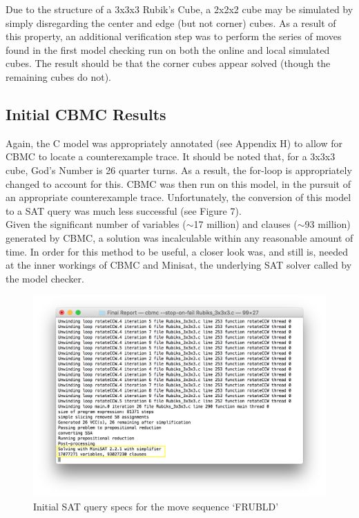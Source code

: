 \documentclass{article}
\begin{document}
\noindent Due to the structure of a 3x3x3 Rubik's Cube, a 2x2x2 cube may be simulated by simply disregarding the center and edge (but not corner) cubes. As a result of this property, an additional verification step was to perform the series of moves found in the first model checking run on both the online and local simulated cubes. The result should be that the corner cubes appear solved (though the remaining cubes do not).

\subsection {Initial CBMC Results}

Again, the C model was appropriately annotated (see Appendix H) to allow for CBMC to locate a counterexample trace. It should be noted that, for a 3x3x3 cube, God's Number is 26 quarter turns. As a result, the for-loop is appropriately changed to account for this. CBMC was then run on this model, in the pursuit of an appropriate counterexample trace. Unfortunately, the conversion of this model to a SAT query was much less successful (see Figure 7).\\

\noindent Given the significant number of variables ($\sim$17 million) and clauses ($\sim$93 million) generated by CBMC, a solution was incalculable within any reasonable amount of time. In order for this method to be useful, a closer look was, and still is, needed at the inner workings of CBMC and Minisat, the underlying SAT solver called by the model checker.\\

\begin{figure}[h]
\includegraphics[width=\textwidth]{pics/3x3x3_SAT_Query_Specs.png}
\caption{Initial SAT query specs for the move sequence `FRUBLD'}
\end{figure}
\end{document}

